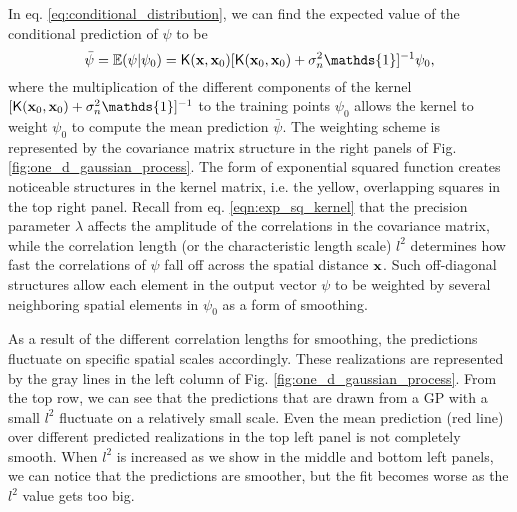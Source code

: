 In eq. \ref{eq:conditional_distribution}, 
we can find the expected value of the conditional prediction of $\psi$ to be 
\begin{equation}
	\bar{\psi} = \mathbb{E}(\psi | \psi_0) = \kerngp(\xv, \xv_0)[\kerngp(\xv_0, \xv_0) +
	\sigma_n^2 \mathds{1}]^{-1}\psi_0, 
\end{equation}
where the multiplication of the different
components of the kernel $ [\kerngp(\xv_0, \xv_0) +
	\sigma_n^2 \mathds{1}]^{-1}$ to
the training points $\psi_0$ allows the kernel to weight $\psi_0$ to compute
the mean prediction $\bar{\psi}$. 
The weighting scheme is represented by the covariance matrix structure in the
right panels of Fig. \ref{fig:one_d_gaussian_process}.
The form of exponential squared function creates noticeable structures in the
kernel matrix, i.e. the yellow,
overlapping squares in the top right panel. 
Recall from eq. \ref{eqn:exp_sq_kernel} that 
the precision parameter $\lambda$ affects the 
amplitude of the correlations in the covariance matrix, while the correlation length (or
the characteristic length scale) $l^2$ 
determines how fast the correlations of  $\psi$ 
fall off across the spatial distance $\mathbf{x}$. 
Such off-diagonal structures allow each element in the output vector $\psi$ to be weighted by
several neighboring spatial elements in $\psi_0$ as a form of smoothing.

As a result of the different correlation lengths for smoothing, 
the predictions fluctuate on specific spatial scales accordingly.
These realizations are represented by the gray lines in the left column of Fig.
\ref{fig:one_d_gaussian_process}. From the top row, we can see that 
the predictions that are drawn from a GP with a small $l^2$ 
fluctuate on a relatively small scale. Even the mean prediction (red line) over
different predicted realizations in the top
left panel is not completely smooth. When $l^2$ is increased as we show in the
middle and bottom left panels, we can notice that the predictions are
smoother, but the fit becomes worse as the $l^2$ value gets too big. 

